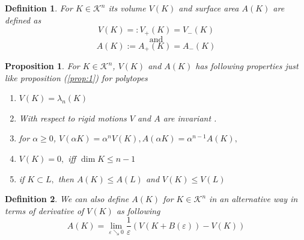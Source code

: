 \documentclass[oneside]{book}
\newtheorem{mydef}{Definition}[section]
\newtheorem{prop}{Proposition}
\begin{document}
	\begin{mydef} \label{d:16}
		For $K \in \mathcal{K}^n$ its volume $V(K) $ and surface area $A(K)$ are defined as 
		\[
		V(K) =: V_{+}(K)=V_{-}(K)
		\]
		$$\text{and} $$
		\[
		A(K) :=  A_{+}(K) = A_{-}(K) 
		\]
		
	\end{mydef}
	\begin{prop}
		
		For $ K \in \mathcal{K}^n $,  $V(K) $ and $A(K) $ has following properties just like proposition (\ref{prop:1}) for polytopes
		\begin{enumerate}
			\item  $V(K)=\lambda_{n}(K)$
			\item With respect to rigid motions $V$ and $A$ are invariant .
			\item  for $\alpha \geq 0$, $V(\alpha K)=\alpha^{n} V(K), A(\alpha K)=\alpha^{n-1} A(K),$ 
			\item $V(K)=0,$ iff $\operatorname{dim} K \leq n-1$
			\item if $K \subset L,$ then  $A(K) \leq A(L)$ and $V(K) \leq V(L)$
		\end{enumerate}
	\end{prop}
	\begin{mydef} \label{d:17}
		We can also define $A(K)$ for $K \in \mathcal{K}^n$ in an alternative way in terms of derivative of $V(K)$ as following \\
		\begin{equation}
			\label{eq48}
			A(K)=\lim _{\varepsilon \searrow 0} \frac{1}{\varepsilon}(V(K+B(\varepsilon))-V(K))
		\end{equation}
	\end{mydef}
	
	
\end{document}
